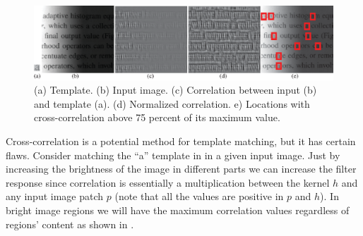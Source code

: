 \begin{figure}[t]
	\includegraphics[width=1\linewidth]{figures/linear_image_filtering/normcorr.eps}
	\caption{(a) Template. (b) Input image. (c) Correlation between input (b) and template (a). (d) Normalized correlation. e) Locations with cross-correlation above 75 percent of its maximum value.
	}
	\label{fig:normcorr}
\end{figure}


Cross-correlation is a potential method for template matching, but it has certain flaws. Consider matching the ``a'' template in  in a given input image. Just by increasing the brightness of the image in different parts we can increase the filter response since correlation is essentially a multiplication between the kernel $h$ and any input image patch $p$  (note that all the values are positive in $p$ and $h$). In bright image regions we will have the maximum correlation values regardless of regions' content as shown in .

